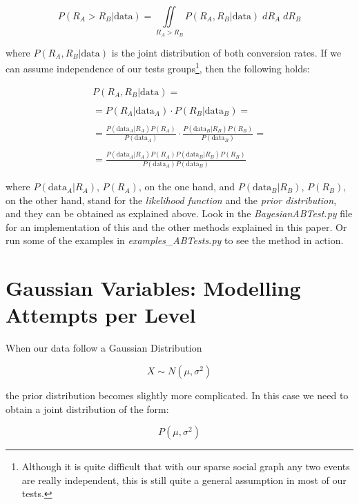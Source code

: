 \documentclass[11pt, a4wide]{article}   	%
\newcommand{\data}{\text{data}}
\newcommand{\convr}{R}
\begin{document}
\begin{equation}
\label{eq:integral-binomial}
P(\convr_A > \convr_B|\data) = \iint\limits_{\convr_A>\convr_B} P(\convr_A,\convr_B|\data)\; d\convr_A\; d\convr_B
\end{equation}

where $P(\convr_A,\convr_B|\data)$ is the joint distribution of both conversion rates. If we can assume independence of our tests groups\footnote{Although it is quite difficult that with our sparse social graph any two events are really independent, this is still quite a general assumption in most of our tests.}, then the following holds:

\begin{equation}
\begin{array}{c}
P(\convr_A,\convr_B|\data) = \\
\\
= P(\convr_A|\data_A)\cdot P(\convr_B|\data_B) = \\
\\
= \frac{P(\data_A|\convr_A)P(\convr_A)}{P(\data_A)} \cdot \frac{P(\data_B|\convr_B)P(\convr_B)}{P(\data_B)} = \\
\\
= \frac{P(\data_A|\convr_A)P(\convr_A)P(\data_B|\convr_B)P(\convr_B)}{P(\data_A)P(\data_B)}
\end{array}
\end{equation}

where $P(\data_A|\convr_A)$, $P(\convr_A)$, on the one hand, and $P(\data_B|\convr_B)$, $P(\convr_B)$, on the other hand, stand for the \emph{likelihood function} and the \emph{prior distribution}, and they can be obtained as explained above. Look in the \emph{BayesianABTest.py} file for an implementation of this and the other methods explained in this paper. Or run some of the examples in \emph{examples\_ABTests.py} to see  the method in action.

\section{Gaussian Variables: Modelling Attempts per Level}

When our data follow a Gaussian Distribution

$$X\sim N(\mu,\sigma^2)$$

the prior distribution becomes slightly more complicated. In this case we need to obtain a joint distribution of the form:

\begin{equation}
P(\mu,\sigma^2)
\end{equation}
\end{document}
